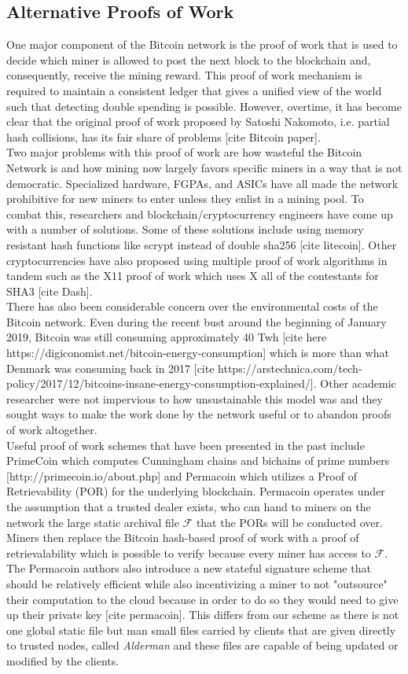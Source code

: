 \documentclass{article}
\begin{document}
\subsection{Alternative Proofs of Work}
One major component of the Bitcoin network is the proof of work that is used to decide which miner is allowed to post the next block to the blockchain and, consequently, receive the mining reward. This proof of work mechanism is required to maintain a consistent ledger that gives a unified view of the world such that detecting double spending is possible. However, overtime, it has become clear that the original proof of work proposed by Satoshi Nakomoto, i.e. partial hash collisions, has its fair share of problems [cite Bitcoin paper].\\
Two major problems with this proof of work are how wasteful the Bitcoin Network is and how mining now largely favors specific miners in a way that is not democratic. Specialized hardware, FGPAs, and ASICs have all made the network prohibitive for new miners to enter unless they enlist in a mining pool. To combat this, researchers and blockchain/cryptocurrency engineers have come up with a number of solutions. Some of these solutions include using memory resistant hash functions like scrypt instead of double sha256 [cite litecoin]. Other cryptocurrencies have also proposed using multiple proof of work algorithms in tandem such as the X11 proof of work which uses X all of the contestants for SHA3 [cite Dash].\\
There has also been considerable concern over the environmental costs of the Bitcoin network. Even during the recent bust around the beginning of January 2019, Bitcoin was still consuming approximately 40 Twh [cite here https://digiconomist.net/bitcoin-energy-consumption] which is more than what Denmark was consuming back in 2017 [cite https://arstechnica.com/tech-policy/2017/12/bitcoins-insane-energy-consumption-explained/]. Other academic researcher were not impervious to how unsustainable this model was and they sought ways to make the work done by the network useful or to abandon proofs of work altogether.\\
Useful proof of work schemes that have been presented in the past include PrimeCoin which computes Cunningham chains and bichains of prime numbers [http://primecoin.io/about.php] and Permacoin which utilizes a Proof of Retrievability (POR) for the underlying blockchain. Permacoin operates under the assumption that a trusted dealer exists, who can hand to miners on the network the large static archival file $\mathcal{F}$ that the PORs will be conducted over. Miners then replace the Bitcoin hash-based proof of work with a proof of retrievalability which is possible to verify because every miner has access to $\mathcal{F}$. The Permacoin authors also introduce a new stateful signature scheme that should be relatively efficient while also incentivizing a miner to not "outsource" their computation to the cloud because in order to do so they would need to give up their private key [cite permacoin]. This differs from our scheme as there is not one global static file but man small files carried by clients that are given directly to trusted nodes, called \emph{Alderman} and these files are capable of being updated or modified by the clients.
\end{document}
